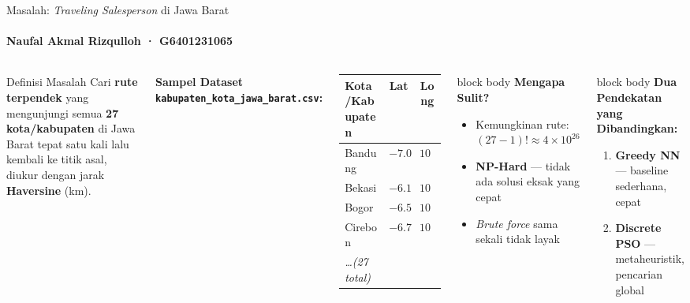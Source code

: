 \documentclass[aspectratio=169,10pt]{beamer}
\begin{document}
\begin{frame}{Masalah: \textit{Traveling Salesperson} di Jawa Barat}
  \framesubtitle{Naufal Akmal Rizqulloh · G6401231065}
  \begin{columns}[T,totalwidth=\textwidth]
    \begin{block}{Definisi Masalah}
      \small
      Cari \textbf{rute terpendek} yang mengunjungi semua
      \textbf{27 kota/kabupaten} di Jawa Barat tepat satu kali
      lalu kembali ke titik asal, diukur dengan jarak
      \textbf{Haversine} (km).
    \end{block}

    \vspace{0.2cm}
    {\small\bfseries Sampel Dataset \texttt{kabupaten\_kota\_jawa\_barat.csv}:}
    \vspace{0.1cm}

    \begin{tabular}{@{}lcc@{}}
      \toprule
      \textbf{Kota/Kabupaten} & \textbf{Lat} & \textbf{Long} \\
      \midrule
      Bandung       & $-7.064$ & $107.634$ \\
      Bekasi        & $-6.198$ & $107.160$ \\
      Bogor         & $-6.545$ & $107.002$ \\
      Cirebon       & $-6.706$ & $108.557$ \\
      \textit{\ldots (27 total)} & & \\
      \bottomrule
    \end{tabular}

    \vspace{0.2cm}
    \begin{beamercolorbox}[wd=\linewidth,sep=8pt,rounded=true]{block body}
      \textbf{Mengapa Sulit?}
      \begin{itemize}\small
        \item Kemungkinan rute: $(27{-}1)! \approx 4\!\times\!10^{26}$
        \item \textbf{NP-Hard} --- tidak ada solusi eksak yang cepat
        \item \textit{Brute force} sama sekali tidak layak
      \end{itemize}
    \end{beamercolorbox}

    \vspace{0.2cm}
    \begin{beamercolorbox}[wd=\linewidth,sep=8pt,rounded=true]{block body}
      \textbf{Dua Pendekatan yang Dibandingkan:}
      \begin{enumerate}\small
        \item \textbf{Greedy NN} --- baseline sederhana, cepat
        \item \textbf{Discrete PSO} --- metaheuristik, pencarian global
      \end{enumerate}
    \end{beamercolorbox}


\end{columns}
\end{frame}
\end{document}
